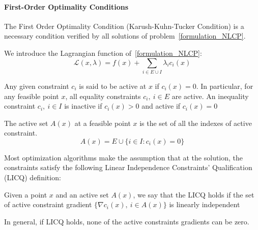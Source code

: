 \paragraph{First-Order Optimality Conditions}

The First Order Optimality Condition (Karush-Kuhn-Tucker Condition) is a necessary condition verified by all solutions of problem~\ref{formulation_NLCP}.

We introduce the Lagrangian function of~\ref{formulation_NLCP}:
\begin{equation}
  \mathcal{L}(x,\lambda) = f(x) + \sum_{i\in E\cup I}\lambda_i c_i(x)
\end{equation}

Any given constraint $c_i$ is said to be active at $x$ if $c_i(x)=0$.
In particular, for any feasible point $x$, all equality constraints $c_i,\ i\in E$ are active.
An inequality constraint $c_i,\ i\in I$ is inactive if $c_i(x)>0$ and active if $c_i(x) = 0$

\begin{definition}
\label{active_set}
  The active set $\mathit{A}(x)$ at a feasible point $x$ is the set of all the indexes of active constraint.
  \begin{equation}
    \mathit{A}(x)=E\cup\{i\in I: c_i(x) = 0\}
  \end{equation}
\end{definition}

Most optimization algorithms make the assumption that at the solution, the constraints satisfy the following Linear Independence Constraints' Qualification (LICQ) definition:

\begin{definition}
  Given a point $x$ and an active set $\mathit{A}(x)$, we say that the LICQ holds if the set of active constraint gradient $\{\nabla c_i(x),\ i\in \mathit{A}(x)\}$ is linearly independent
\end{definition}

In general, if LICQ holds, none of the active constraints gradients can be zero.

